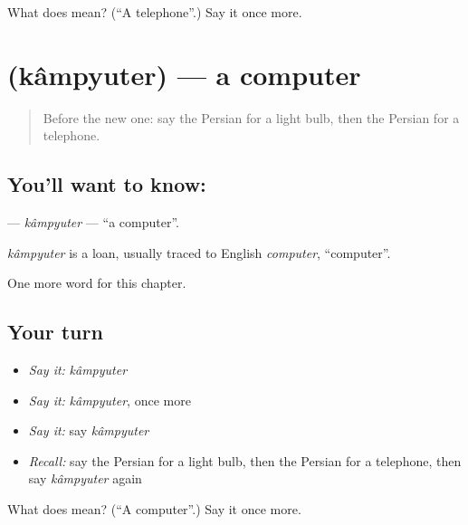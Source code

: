 \begin{tcolorbox}[breakable,colback=teal!4,colframe=teal!35!black,title={Before you move on}]
What does  mean? (\textquotedblleft{}A telephone\textquotedblright{}.) Say it once more.
\end{tcolorbox}
\section[\texorpdfstring{\fa{کامپیوتر} (kâmpyuter)}{کامپیوتر (kâmpyuter)}]{ (kâmpyuter) — a computer}

\label{lesson:FA-C110-kampyuter}



\begin{quote}
Before the new one: say the Persian for a light bulb, then the Persian for a telephone.
\end{quote}

\subsection*{You'll want to know: }
\textbf{} — \emph{kâmpyuter} — \textquotedblleft{}a computer\textquotedblright{}.

\begin{cousinweb}
\emph{kâmpyuter} is a loan, usually traced to English \emph{computer}, \textquotedblleft{}computer\textquotedblright{}.
\end{cousinweb}

\begin{grammarlens}[title={What you've built}]
One more word for this chapter.
\end{grammarlens}

\subsection*{Your turn}
\begin{itemize}
\raggedright
  \item \emph{Say it:} \emph{kâmpyuter}
  \item \emph{Say it:} \emph{kâmpyuter}, once more
  \item \emph{Say it:} say \emph{kâmpyuter}
  \item \emph{Recall:} say the Persian for a light bulb, then the Persian for a telephone, then say \emph{kâmpyuter} again
\end{itemize}

\begin{tcolorbox}[breakable,colback=teal!4,colframe=teal!35!black,title={Before you move on}]
What does  mean? (\textquotedblleft{}A computer\textquotedblright{}.) Say it once more.
\end{tcolorbox}
